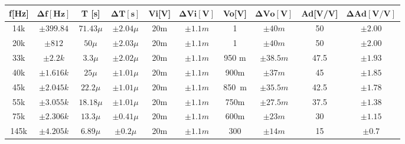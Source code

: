 \begin{enumerate}
        \begin{table}[H]
          \centering
          \begin{tabular}{|c|c|c|c|c|c|c|c|c|c|}
            \hline
            \textbf{f[Hz]} & $\mathbf{\Delta f [Hz]}$ & \textbf{T [s]} & $\mathbf{\Delta T [s]}$ & \textbf{Vi[V]} & $\mathbf{\Delta Vi[V]}$ & \textbf{Vo[V]} & $\mathbf{\Delta Vo[V]}$ & \textbf{Ad[V/V]} & $\mathbf{\Delta Ad[V/V]}$ \\
            \hline
            14k            & $\pm 399.84$             & $71.43 \mu$    & $\pm 2.04 \mu$          & 20m            & $\pm 1.1m$              & 1              & $\pm 40m$               & 50               & $\pm 2.00$                \\
            \hline
            20k            & $\pm 812$                & $50 \mu$       & $\pm 2.03 \mu$          & 20m            & $\pm 1.1m$              & 1              & $\pm 40m$               & 50               & $\pm 2.00$                \\
            \hline
            33k            & $\pm 2.2 k$              & $3.3 \mu$      & $\pm 2.02 \mu$          & 20m            & $\pm 1.1m$              & 950 m          & $\pm 38.5m$             & 47.5             & $\pm 1.93$                \\
            \hline
            40k            & $\pm 1.616k$             & $25 \mu$       & $\pm 1.01 \mu$          & 20m            & $\pm 1.1m$              & 900m           & $\pm 37m$               & 45               & $\pm 1.85$                \\
            \hline
            45k            & $\pm 2.045k$             & $22.2 \mu$     & $\pm 1.01 \mu$          & 20m            & $\pm 1.1m$              & 850 m          & $\pm 35.5m$             & 42.5             & $\pm 1.78$                \\
            \hline
            55k            & $\pm 3.055k$             & $18.18 \mu$    & $\pm 1.01 \mu$          & 20m            & $\pm 1.1m$              & 750m           & $\pm 27.5m$             & 37.5             & $\pm 1.38$                \\
            \hline
            75k            & $\pm 2.306k$             & $13.3\mu$      & $\pm 0.41 \mu$          & 20m            & $\pm 1.1m$              & 600m           & $\pm 23m$               & 30               & $\pm 1.15$                \\
            \hline
            145k           & $\pm 4.205k$             & $6.89 \mu$     & $\pm0.2\mu$             & 20m            & $\pm 1.1m$              & 300            & $\pm 14m$               & 15               & $\pm 0.7$                 \\

\end{tabular}
\end{table}
\end{enumerate}
